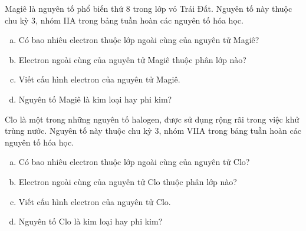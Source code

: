 \begin{bt}%
	Magiê là nguyên tố phổ biến thứ 8 trong lớp vỏ Trái Đất. Nguyên tố này thuộc chu kỳ 3, nhóm IIA trong bảng tuần hoàn các nguyên tố hóa học.
	\begin{enumerate}[a)]
		\item Có bao nhiêu electron thuộc lớp ngoài cùng của nguyên tử Magiê?
		\item Electron ngoài cùng của nguyên tử Magiê thuộc phân lớp nào?
		\item Viết cấu hình electron của nguyên tử Magiê.
		\item Nguyên tố Magiê là kim loại hay phi kim?
	\end{enumerate}
\end{bt}
\begin{bt}%
	Clo là một trong những nguyên tố halogen, được sử dụng rộng rãi trong việc khử trùng nước. Nguyên tố này thuộc chu kỳ 3, nhóm VIIA trong bảng tuần hoàn các nguyên tố hóa học.
	\begin{enumerate}[a)]
		\item Có bao nhiêu electron thuộc lớp ngoài cùng của nguyên tử Clo?
		\item Electron ngoài cùng của nguyên tử Clo thuộc phân lớp nào?
		\item Viết cấu hình electron của nguyên tử Clo.
		\item Nguyên tố Clo là kim loại hay phi kim?
	\end{enumerate}
\end{bt}
